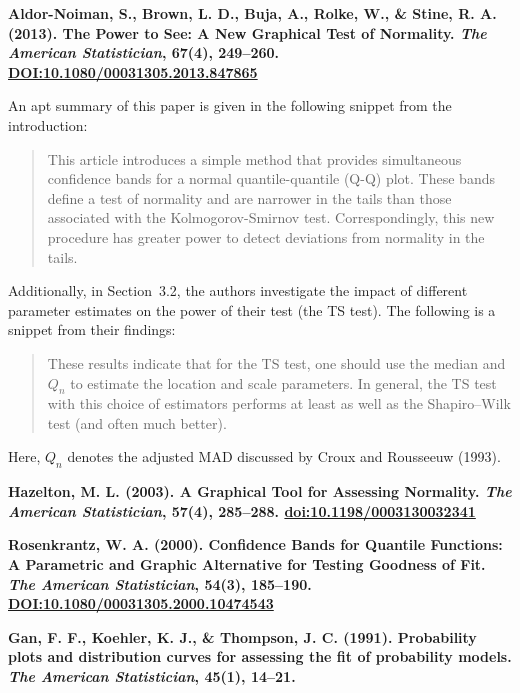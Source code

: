 \documentclass{article}
\begin{document}
\textbf{Aldor-Noiman, S., Brown, L. D., Buja, A., Rolke, W., \& Stine, R. A. (2013). The Power to See: A New Graphical Test of Normality. \emph{The American Statistician}, 67(4), 249--260. \url{DOI:10.1080/00031305.2013.847865}}

An apt summary of this paper is given in the following snippet from the introduction:
\begin{quote}
This article introduces a simple method that provides simultaneous confidence bands for a normal quantile-quantile (Q-Q) plot. These bands define a test of normality and are narrower in the tails than those associated with the Kolmogorov-Smirnov test. Correspondingly, this new procedure has greater power to detect deviations from normality in the tails.
\end{quote}

Additionally, in Section~3.2, the authors investigate the impact of different parameter estimates on the power of their test (the TS test). The following is a snippet from their findings:

\begin{quote}
These results indicate that for the TS test, one should use the median and $Q_n$ to estimate the location and scale parameters. In general, the TS test with this choice of estimators performs at least as well as the Shapiro--Wilk test (and often much better).
\end{quote}

Here, $Q_n$ denotes the adjusted MAD discussed by Croux and Rousseeuw (1993).

\bigskip


{\bf Hazelton, M. L. (2003). A Graphical Tool for Assessing Normality. \emph{The American Statistician}, 57(4), 285--288. \url{doi:10.1198/0003130032341}}

{\bf Rosenkrantz, W. A. (2000). Confidence Bands for Quantile Functions: A Parametric and Graphic Alternative for Testing Goodness of Fit. \emph{The American Statistician}, 54(3), 185--190. \url{DOI:10.1080/00031305.2000.10474543}}

{\bf Gan, F. F., Koehler, K. J., \& Thompson, J. C. (1991). Probability plots and distribution curves for assessing the fit of probability models. \emph{The American Statistician}, 45(1), 14--21.}
\end{document}
